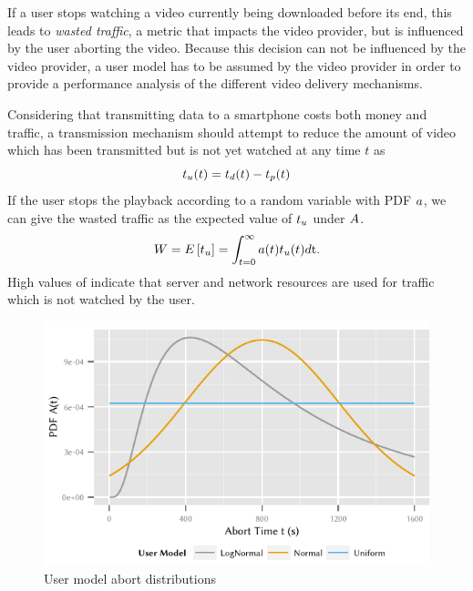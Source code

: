 If a user stops watching a video currently being downloaded before its end, this leads to \emph{wasted traffic}, a metric that impacts the video provider, but is influenced by the user aborting the video.
Because this decision can not be influenced by the video provider, a user model has to be assumed by the video provider in order to provide a performance analysis of the different video delivery mechanisms.

Considering that transmitting data to a smartphone costs both money and traffic, a transmission mechanism should attempt to reduce the amount of video which has been transmitted but is not yet watched at any time \(t\) as 
\[t_u(t) = t_d(t) - t_p(t)\]
If the user stops the playback according to a random variable \userabortrv with \gls{PDF} \(a\), we can give the wasted traffic \meanwastedtraffic as the expected value of $t_u$ under $A$.
\begin{equation}
W = E\left[t_u\right] = \int_{t=0}^{\infty} a(t) t_u(t) d\mathrm{t}.
\end{equation}
High values of \meanwastedtraffic indicate that server and network resources are used for traffic which is not watched by the user.

\begin{figure}
\begin{center}
  \includegraphics{application/lte_video/system_model/figures/abort_distributions}
  \caption{User model abort distributions}
  \label{fig:application:lte_video:system_model:model_assumptions:metrics:abort_distributions}
\end{center}
\end{figure}


